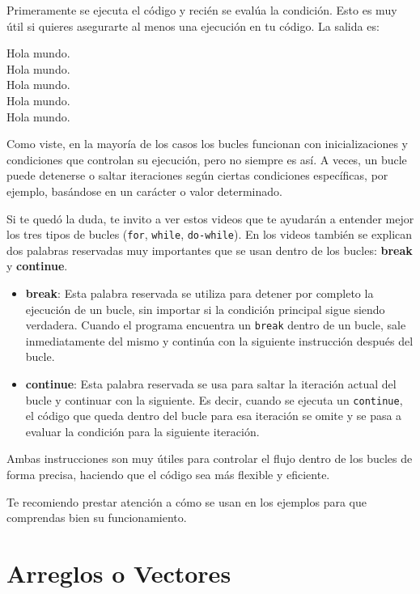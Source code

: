 \documentclass[
  11pt,
  a4paper,
  DIV=11,
  numbers=noendperiod]{scrreprt}
\begin{document}
Primeramente se ejecuta el código y recién se evalúa la condición. Esto
es muy útil si quieres asegurarte al menos una ejecución en tu código.
La salida es:

\begin{tcolorbox}[custombox]
Hola mundo. \\
Hola mundo. \\
Hola mundo. \\
Hola mundo. \\
Hola mundo.
\end{tcolorbox}

Como viste, en la mayoría de los casos los bucles funcionan con
inicializaciones y condiciones que controlan su ejecución, pero no
siempre es así. A veces, un bucle puede detenerse o saltar iteraciones
según ciertas condiciones específicas, por ejemplo, basándose en un
carácter o valor determinado.

Si te quedó la duda, te invito a ver estos videos que te ayudarán a
entender mejor los tres tipos de bucles (\texttt{for}, \texttt{while},
\texttt{do-while}). En los videos también se explican dos palabras
reservadas muy importantes que se usan dentro de los bucles:
\textbf{break} y \textbf{continue}.

\begin{itemize}
\item
  \textbf{break}: Esta palabra reservada se utiliza para detener por
  completo la ejecución de un bucle, sin importar si la condición
  principal sigue siendo verdadera. Cuando el programa encuentra un
  \texttt{break} dentro de un bucle, sale inmediatamente del mismo y
  continúa con la siguiente instrucción después del bucle.
\item
  \textbf{continue}: Esta palabra reservada se usa para saltar la
  iteración actual del bucle y continuar con la siguiente. Es decir,
  cuando se ejecuta un \texttt{continue}, el código que queda dentro del
  bucle para esa iteración se omite y se pasa a evaluar la condición
  para la siguiente iteración.
\end{itemize}

Ambas instrucciones son muy útiles para controlar el flujo dentro de los
bucles de forma precisa, haciendo que el código sea más flexible y
eficiente.

Te recomiendo prestar atención a cómo se usan en los ejemplos para que
comprendas bien su funcionamiento.


\chapter{Arreglos o Vectores}\label{arreglos-o-vectores}
\end{document}
